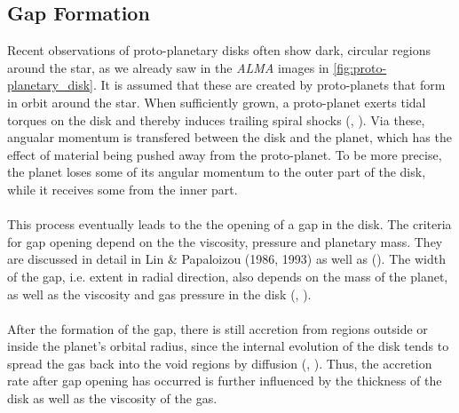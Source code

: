     \subsection{Gap Formation}
      Recent observations of proto-planetary disks often show dark, circular 
      regions around the star, as we already saw in the \textit{ALMA} images 
      in \autoref{fig:proto-planetary_disk}.
      It is assumed that these are created by proto-planets that form in orbit 
      around the star. When sufficiently grown, a 
      proto-planet exerts tidal torques on the disk and thereby induces 
      trailing spiral shocks (\citeauthor{Kley_1999}, 
      \citeyear{Kley_1999}). Via these, angualar momentum is 
      transfered between the disk and the planet, which has the effect of 
      material being pushed away from the proto-planet. To be more precise, 
      the planet loses some of its angular momentum 
      to the outer part of the disk, while it receives some from the inner 
      part. \\
      \\
      This process 
      eventually leads to the the opening of a gap in the disk. The criteria
      for gap opening depend on the the viscosity, pressure 
      and planetary mass. They are discussed in detail in 
      Lin \& Papaloizou (1986, 1993) as well as \citeauthor{Crida_2006} 
      (\citeyear{Crida_2006}). The width of the gap, i.e. 
      extent in radial direction, also depends on the mass of the 
      planet, as well as the viscosity and gas pressure in the disk 
      (\citeauthor{Lin_Papaloizou_1993}, \citeyear{Lin_Papaloizou_1993}). \\
      \\
      After the formation of the gap, there is still accretion from regions 
      outside or inside the planet's orbital radius, since the internal 
      evolution of the disk tends to spread the gas back into the void regions
      by diffusion (\citeauthor{Kley_1999}, 
      \citeyear{Kley_1999}). Thus, the accretion rate after gap 
      opening has occurred is further influenced by the thickness of the disk 
      as well as the viscosity of the gas.
